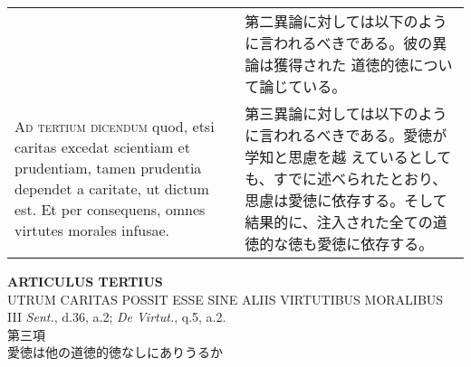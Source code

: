 \documentclass[10pt]{jsarticle}
\begin{document}
\begin{longtable}{p{21em}p{21em}}
 
&

第二異論に対しては以下のように言われるべきである。彼の異論は獲得された
道徳的徳について論じている。
 

\\

 {\scshape Ad tertium dicendum} quod, etsi caritas excedat scientiam
 et prudentiam, tamen prudentia dependet a caritate, ut dictum est. Et
 per consequens, omnes virtutes morales infusae.

 
&

第三異論に対しては以下のように言われるべきである。愛徳が学知と思慮を越
えているとしても、すでに述べられたとおり、思慮は愛徳に依存する。そして
結果的に、注入された全ての道徳的な徳も愛徳に依存する。



\end{longtable}
\newpage

\begin{center}
{\Large {\bf ARTICULUS TERTIUS}}\\
{\large UTRUM CARITAS POSSIT ESSE SINE ALIIS VIRTUTIBUS MORALIBUS}\\
{\footnotesize III {\itshape Sent.}, d.36, a.2; {\itshape De Virtut.}, q.5, a.2.}\\
{\Large 第三項\\愛徳は他の道徳的徳なしにありうるか}
\end{center}
\end{document}
